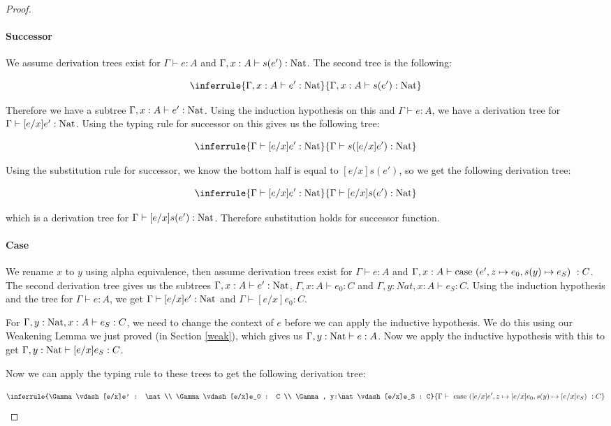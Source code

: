 \begin{proof}
\paragraph{Successor} We assume derivation trees exist for $\Gamma \vdash e : A$ and $\Gamma, x:A \vdash s(e') : \operatorname{Nat}$. The second tree is the following:

$$\inferrule{\Gamma, x:A \vdash e' : \nat}{\Gamma, x:A \vdash s(e') : \nat}$$

Therefore we have a subtree $\Gamma, x:A \vdash e' : \operatorname{Nat}$. Using the induction hypothesis on this and $\Gamma \vdash e : A$, we have a derivation tree for $\Gamma \vdash [e/x]e' : \operatorname{Nat}$. Using the typing rule for successor on this gives us the following tree:

$$\inferrule{\Gamma \vdash [e/x]e' : \nat}{\Gamma \vdash s([e/x]e') : \nat}$$

Using the substitution rule for successor, we know the bottom half is equal to $[e/x]s(e')$, so we get the following derivation tree:

 $$\inferrule{\Gamma \vdash [e/x]e' : \nat}{\Gamma \vdash [e/x]s(e') : \nat}$$
 
which is a derivation tree for $\Gamma \vdash [e/x]s(e') : \operatorname{Nat}$. Therefore substitution holds for successor function.

\paragraph{Case} We rename $x$ to $y$ using alpha equivalence, then assume derivation trees exist for $\Gamma \vdash e : A$ and $\Gamma, x: A \vdash \operatorname{case} \ (e', z \mapsto e_0 , s(y) \mapsto e_S) \  : C$. The second derivation tree gives us the subtrees $\Gamma, x:A \vdash e' : \operatorname{Nat}$, $\Gamma, x : A \vdash e_0 : C$ and $\Gamma, y:Nat, x : A \vdash e_S : C$. Using the induction hypothesis and the tree for $\Gamma \vdash e : A$, we get  $\Gamma \vdash [e/x]e' : \operatorname{Nat}$ and $\Gamma \vdash [e/x]e_0 : C$.

For $\Gamma, y:\operatorname{Nat}, x : A \vdash e_S : C$, we need  to change the context of $e$ before we can apply the inductive hypothesis. We do this using our  Weakening Lemma we just proved (in Section \ref{weak}), which gives us $\Gamma, y:\operatorname{Nat} \vdash e : A$. Now we apply the inductive hypothesis with this to get $\Gamma, y:\operatorname{Nat} \vdash [e/x]e_S : C$.
 
 
Now we can apply the typing rule to these trees to get the following derivation tree:

$$\inferrule{\Gamma \vdash [e/x]e' : \nat \\  \Gamma \vdash [e/x]e_0 : C \\  \Gamma , y:\nat \vdash [e/x]e_S : C}  {\Gamma \vdash \ \case \ ([e/x]e', z \mapsto [e/x]e_0 , s(y) \mapsto [e/x]e_S) \  : C}  
$$


\end{proof}

